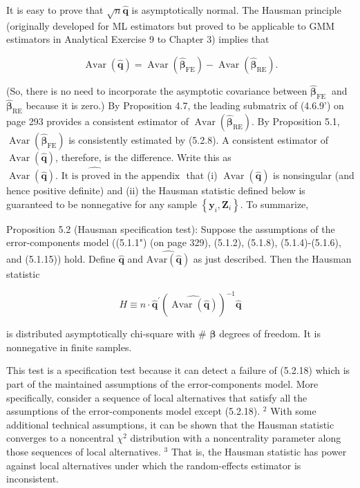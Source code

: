 \documentclass[10pt]{article}
\begin{document}
It is easy to prove that $\sqrt{n} \hat{\mathbf{q}}$ is asymptotically normal. The Hausman principle (originally developed for ML estimators but proved to be applicable to GMM estimators in Analytical Exercise 9 to Chapter 3) implies that


\begin{equation*}
\operatorname{Avar}(\hat{\mathbf{q}})=\operatorname{Avar}\left(\widehat{\boldsymbol{\beta}}_{\mathrm{FE}}\right)-\operatorname{Avar}\left(\widehat{\boldsymbol{\beta}}_{\mathrm{RE}}\right) . \tag{5.2.21}
\end{equation*}


(So, there is no need to incorporate the asymptotic covariance between $\widehat{\boldsymbol{\beta}}_{\text {FE }}$ and $\widehat{\boldsymbol{\beta}}_{\mathrm{RE}}$ because it is zero.) By Proposition 4.7, the leading submatrix of (4.6.9') on page 293 provides a consistent estimator of $\operatorname{Avar}\left(\widehat{\boldsymbol{\beta}}_{\mathrm{RE}}\right)$. By Proposition 5.1, $\operatorname{Avar}\left(\widehat{\boldsymbol{\beta}}_{\mathrm{FE}}\right)$ is consistently estimated by (5.2.8). A consistent estimator of $\operatorname{Avar}(\hat{\mathbf{q}})$, therefore, is the difference. Write this as $\widehat{\operatorname{Avar}(\hat{\mathbf{q}}) \text {. It is proved in the appendix }}$ that (i) $\operatorname{Avar}(\hat{\mathbf{q}})$ is nonsingular (and hence positive definite) and (ii) the Hausman statistic defined below is guaranteed to be nonnegative for any sample $\left\{\mathbf{y}_{i}, \mathbf{Z}_{i}\right\}$. To summarize,

Proposition 5.2 (Hausman specification test): Suppose the assumptions of the error-components model ((5.1.1") (on page 329), (5.1.2), (5.1.8), (5.1.4)-(5.1.6), and (5.1.15)) hold. Define $\hat{\mathbf{q}}$ and $\widehat{\mathrm{Avar}(\hat{\mathbf{q}})}$ as just described. Then the Hausman statistic


\begin{equation*}
H \equiv n \cdot \hat{\mathbf{q}}^{\prime}(\widehat{\operatorname{Avar}(\hat{\mathbf{q}})})^{-1} \hat{\mathbf{q}} \tag{5.2.22}
\end{equation*}


is distributed asymptotically chi-square with \# $\boldsymbol{\beta}$ degrees of freedom. It is nonnegative in finite samples.

This test is a specification test because it can detect a failure of (5.2.18) which is part of the maintained assumptions of the error-components model. More specifically, consider a sequence of local alternatives that satisfy all the assumptions of the error-components model except (5.2.18). ${ }^{2}$ With some additional technical assumptions, it can be shown that the Hausman statistic converges to a noncentral $\chi^{2}$ distribution with a noncentrality parameter along those sequences of local alternatives. ${ }^{3}$ That is, the Hausman statistic has power against local alternatives under which the random-effects estimator is inconsistent.
\end{document}
